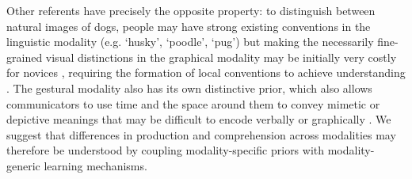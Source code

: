 Other referents have precisely the opposite property: to distinguish between natural images of dogs, people may have strong existing conventions in the linguistic modality (e.g. `husky', `poodle', `pug') but making the necessarily fine-grained visual distinctions in the graphical modality may be initially very costly for novices \cite{fan2020pragmatic}, requiring the formation of local conventions to achieve understanding \cite{hawkins2019disentangling}. 
The gestural modality also has its own distinctive prior, which also allows communicators to use time and the space around them to convey mimetic or depictive meanings that may be difficult to encode verbally or graphically \cite{goldin-meadow_role_1999,clark2016depicting,mcneill1992hand}. 
We suggest that differences in production and comprehension across modalities may therefore be understood by coupling modality-specific priors with modality-generic learning mechanisms.




